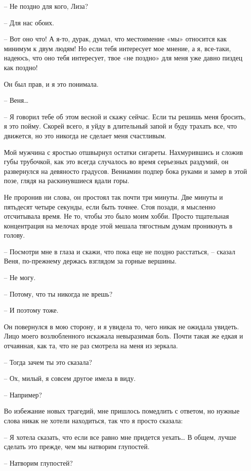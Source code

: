 \documentclass[
]{book}
\begin{document}
-- Не поздно для кого, Лиза?

-- Для нас обоих.

-- Вот оно что! А я-то, дурак, думал, что местоимение «мы» относится как минимум к двум людям! Но если тебя интересует мое мнение, а я, все-таки, надеюсь, что оно тебя интересует, твое «не поздно» для меня уже давно пиздец как поздно!

Он был прав, и я это понимала.

-- Веня\ldots{}

-- Я говорил тебе об этом весной и скажу сейчас. Если ты решишь меня бросить, я это пойму. Скорей всего, я уйду в длительный запой и буду трахать все, что движется, но это никогда не сделает меня счастливым.

Мой мужчина с яростью отшвырнул остатки сигареты. Нахмурившись и сложив губы трубочкой, как это всегда случалось во время серьезных раздумий, он развернулся на девяносто градусов. Вениамин подпер бока руками и замер в этой позе, глядя на раскинувшиеся вдали горы.

Не проронив ни слова, он простоял так почти три минуты. Две минуты и пятьдесят четыре секунды, если быть точнее. Стоя позади, я мысленно отсчитывала время. Не то, чтобы это было моим хобби. Просто тщательная концентрация на мелочах вроде этой мешала тягостным думам проникнуть в голову.

-- Посмотри мне в глаза и скажи, что пока еще не поздно расстаться, -- сказал Веня, по-прежнему держась взглядом за горные вершины.

-- Не могу.

-- Потому, что ты никогда не врешь?

-- И поэтому тоже.

Он повернулся в мою сторону, и я увидела то, чего никак не ожидала увидеть. Лицо моего возлюбленного искажала невыразимая боль. Почти такая же едкая и отчаянная, как та, что не раз смотрела на меня из зеркала.

-- Тогда зачем ты это сказала?

-- Ох, милый, я совсем другое имела в виду.

-- Например?

Во избежание новых трагедий, мне пришлось помедлить с ответом, но нужные слова никак не хотели находиться, так что я просто сказала:

-- Я хотела сказать, что если все равно мне придется уехать\ldots{} В общем, лучше сделать это прежде, чем мы натворим глупостей.

-- Натворим глупостей?
\end{document}
